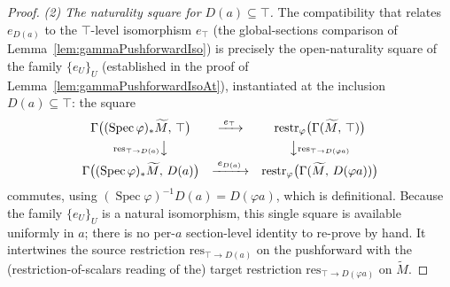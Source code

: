 \begin{proof}
  \emph{(2) The naturality square for \(D(a) \subseteq \top\).} The compatibility
  that relates \(e_{D(a)}\) to the \(\top\)-level isomorphism
  \(e_\top\) (the global-sections comparison of
  Lemma~\ref{lem:gammaPushforwardIso}) is precisely the open-naturality square of the
  family \(\{e_U\}_U\) (established in the proof of
  Lemma~\ref{lem:gammaPushforwardIsoAt}), instantiated at the inclusion
  \(D(a) \subseteq \top\): the square
  \[
    \begin{array}{ccc}
      \Gamma\bigl((\operatorname{Spec}\varphi)_*\widetilde M,\, \top\bigr)
        & \xrightarrow{\;e_\top\;}
        & \operatorname{restr}_\varphi\bigl(\Gamma(\widetilde M,\, \top)\bigr) \\[4pt]
      {\scriptstyle \mathrm{res}_{\top \to D(a)}}\big\downarrow & &
        \big\downarrow{\scriptstyle \mathrm{res}_{\top \to D(\varphi a)}} \\[4pt]
      \Gamma\bigl((\operatorname{Spec}\varphi)_*\widetilde M,\, D(a)\bigr)
        & \xrightarrow{\;e_{D(a)}\;}
        & \operatorname{restr}_\varphi\bigl(\Gamma(\widetilde M,\, D(\varphi a))\bigr)
    \end{array}
  \]
  commutes, using \((\operatorname{Spec}\varphi)^{-1}D(a) = D(\varphi a)\), which is
  definitional. Because the family \(\{e_U\}_U\) is a natural isomorphism, this single
  square is available uniformly in \(a\); there is no per-\(a\) section-level identity
  to re-prove by hand. It intertwines the source restriction
  \(\mathrm{res}_{\top \to D(a)}\) on the pushforward with the (restriction-of-scalars
  reading of the) target restriction \(\mathrm{res}_{\top \to D(\varphi a)}\) on
  \(\widetilde M\).


\end{proof}
